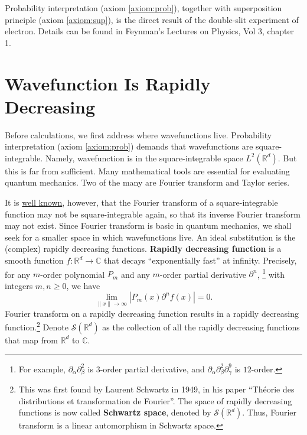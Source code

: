 \documentclass{book}
\newcommand{\tmstrong}[1]{\textbf{#1}}
\begin{document}
Probability interpretation (axiom \ref{axiom:prob}), together with
superposition principle (axiom \ref{axiom:sup}), is the direct result of the
double-slit experiment of electron. Details can be found in Feynman's Lectures
on Physics, Vol 3, chapter 1.

\section{Wavefunction Is Rapidly Decreasing}\label{section:Wavefunction Is Rapidly Decreasing}

Before calculations, we first address where wavefunctions live. Probability
interpretation (axiom \ref{axiom:prob}) demands that wavefunctions are
square-integrable. Namely, wavefunction is in the square-integrable space $L^2
(\mathbb{R}^d)$. But this is far from sufficient. Many mathematical tools are
essential for evaluating quantum mechanics. Two of the many are Fourier
transform and Taylor series.

It is
\href{https://en.wikipedia.org/wiki/Fourier\\\\\\\\\\\\\\\\\\\\\\\\\\\\\\\_transform}{well
known}, however, that the Fourier transform of a square-integrable function
may not be square-integrable again, so that its inverse Fourier transform may
not exist. Since Fourier transform is basic in quantum mechanics, we shall
seek for a smaller space in which wavefunctions live. An ideal substitution is
the (complex) rapidly decreasing functions. {\tmstrong{Rapidly decreasing
function}} is a smooth function $f : \mathbb{R}^d \rightarrow \mathbb{C}$ that
decays ``exponentially fast'' at infinity. Precisely, for any $m$-order
polynomial $P_m$ and any $m$-order partial derivative $\partial^n$,
\footnote{For example, $\partial_{\alpha} \partial_{\beta}^2$ is $3$-order
partial derivative, and $\partial_{\alpha} \partial_{\beta}^2
\partial_{\gamma}^9$ is $12$-order.} with integers $m, n \geqslant 0$, we have
\[ \lim_{\|x\| \rightarrow \infty} |P_m (x) \partial^n f (x) | = 0. \]
Fourier transform on a rapidly decreasing function results in a rapidly
decreasing function.\footnote{This was first found by Laurent Schwartz in
1949, in his paper ``Théorie des distributions et transformation de
Fourier''. The space of rapidly decreasing functions is now called
{\tmstrong{Schwartz space}}, denoted by $\mathcal{S} (\mathbb{R}^d)$. Thus,
Fourier transform is a linear automorphism in Schwartz space.} Denote
$\mathcal{S} (\mathbb{R}^d)$ as the collection of all the rapidly decreasing
functions that map from $\mathbb{R}^d$ to $\mathbb{C}$.
\end{document}
